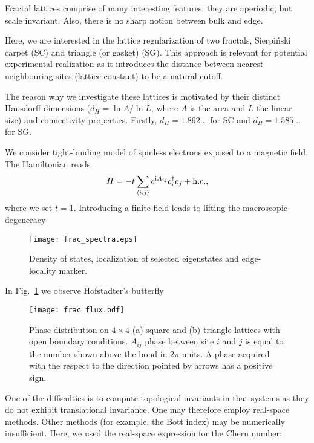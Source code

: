 Fractal lattices comprise of many interesting features: they are aperiodic, but scale invariant. Also, there is no sharp notion between bulk and edge.

Here, we are interested in the lattice regularization of two fractals, Sierpiński carpet (SC) and triangle (or gasket) (SG). This approach is relevant for potential experimental realization as it introduces the distance between nearest-neighbouring sites (lattice constant) to be a natural cutoff.

The reason why we investigate these lattices is motivated by their distinct Hausdorff dimensions ($d_H = \ln A / \ln L$, where $A$ is the area and $L$ the linear size) and connectivity properties. Firstly, $d_H = 1.892 \ldots$ for SC and $d_H = 1.585 \ldots$ for SG. 



We consider tight-binding model of spinless electrons exposed to a magnetic field. The Hamiltonian reads
\begin{equation}
H = -t  \sum_{\langle i, j \rangle} e^{\textnormal{i} A_{ij}} c^{\dagger}_i c_j + \mathrm{h.c.},
\label{eq:frac_ham}
\end{equation}
where we set $t = 1$. Introducing a finite field leads to lifting the macroscopic degeneracy

\begin{figure}
\centering
\texttt{[image: frac\_spectra.eps]} 
\caption{Density of states, localization of selected eigenstates and edge-locality marker.}
\label{fig:frac_spect}
\end{figure}

In Fig.~\ref{fig:frac_spect} we observe Hofstadter's butterfly~\cite{1976:Hofstadter}

\begin{figure}
\centering
\texttt{[image: frac\_flux.pdf]} 
\caption{Phase distribution on $4 \times 4$ (a) square and (b) triangle lattices with open boundary conditions. $A_{ij}$ phase between site $i$ and $j$ is equal to the number shown above the bond in $2 \pi$ units. A phase acquired with the respect to the direction pointed by arrows has a positive sign.}
\label{fig:flux_distr}
\end{figure}


One of the difficulties is to compute topological invariants in that systems as they do not exhibit translational invariance. One may therefore employ real-space methods. Other methods (for example, the Bott index) may be numerically insufficient. Here, we used the real-space expression for the Chern number:





